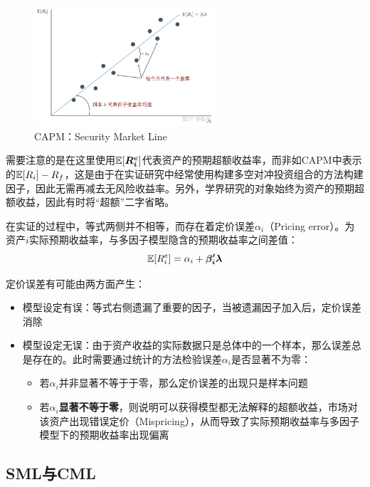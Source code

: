 \documentclass[11pt]{article}
\begin{document}
\begin{figure}[H]
    \centering
    \includegraphics[width=0.6\textwidth]{fig/capm-sml.jpg}
    \caption{CAPM：Security Market Line}
    \label{fig:capm-sml}
\end{figure}

需要注意的是在这里使用$\mathbb{E}[\bm{R_i^e}]$代表资产的预期超额收益率，而非如CAPM中表示的$\mathbb{E}[R_i] - R_f$，这是由于在实证研究中经常使用构建多空对冲投资组合的方法构建因子，因此无需再减去无风险收益率。另外，学界研究的对象始终为资产的预期超额收益，因此有时将“超额”二字省略。

在实证的过程中，等式两侧并不相等，而存在着定价误差$\alpha_i$（Pricing error）。为资产$i$实际预期收益率，与多因子模型隐含的预期收益率之间差值：
\begin{equation*}
    \mathbb{E}[R_i^e] = \alpha_i + \bm{\beta_{i}' \lambda}
\end{equation*}

定价误差有可能由两方面产生：
\begin{itemize}
    \item 模型设定有误：等式右侧遗漏了重要的因子，当被遗漏因子加入后，定价误差消除
    \item 模型设定无误：由于资产收益的实际数据只是总体中的一个样本，那么误差总是存在的。此时需要通过统计的方法检验误差$\alpha_i$是否显著不为零：
    \begin{itemize}
        \item 若$\alpha_i$并非显著不等于于零，那么定价误差的出现只是样本问题
        \item 若$\alpha_i$\textbf{显著不等于零}，则说明可以获得模型都无法解释的超额收益，市场对该资产出现错误定价（Mispricing），从而导致了实际预期收益率与多因子模型下的预期收益率出现偏离
    \end{itemize}
\end{itemize}

\subsection*{SML与CML}
\end{document}
